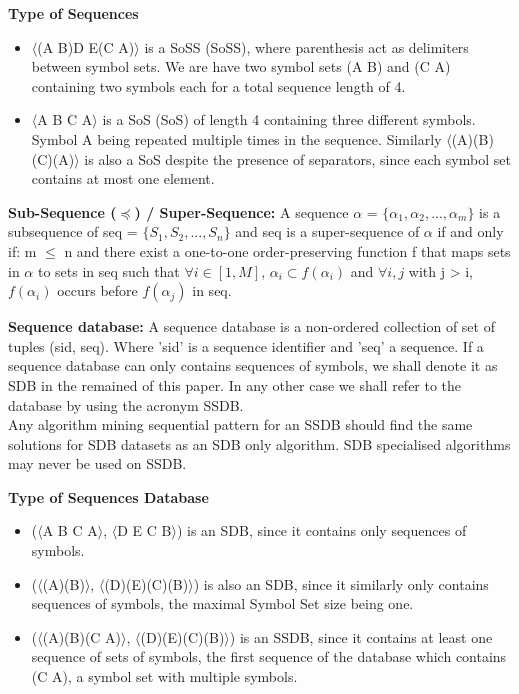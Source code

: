 \documentclass{eplmastersthesis}
\begin{document}
\begin{example}{\bfseries Type of Sequences}
\begin{itemize}
\item $\langle$(A B)D E(C A)$\rangle$ is a \acrlong{SoSS} (\acrshort{SoSS}), where parenthesis act as delimiters between symbol sets. We are have two symbol sets (A B) and (C A) containing two symbols each for a total sequence length of 4.
\item $\langle$A B C A$\rangle$ is a \acrlong{SoS} (\acrshort{SoS}) of length 4 containing three different symbols. Symbol A being repeated multiple times in the sequence. Similarly $\langle$(A)(B)(C)(A)$\rangle$ is also a \acrshort{SoS} despite the presence of separators, since each symbol set contains at most one element.
\end{itemize}
\end{example}

\begin{definition}{\bfseries Sub-Sequence ($\preceq$) / Super-Sequence:}
A sequence $\alpha$ = $\{\alpha_1, \alpha_2, ..., \alpha_m\}$ is a subsequence of seq = $\{S_1, S_2, ..., S_n\}$ and seq is a super-sequence of $\alpha$ if and only if: m $\leq$ n and there exist a one-to-one order-preserving function f that maps sets in $\alpha$ to sets in seq such that $\forall i \in [1, M]$, $\alpha_i \subset f(\alpha_i)$ and $\forall i,j$ with j > i, $f(\alpha_i)$ occurs before $f(\alpha_j)$ in seq.
\end{definition}

\begin{definition}{\bfseries Sequence database:}
A sequence database is a non-ordered collection of set of tuples (sid, seq). Where 'sid' is a sequence identifier and 'seq' a sequence. If a sequence database can only contains sequences of symbols, we shall denote it as SDB in the remained of this paper. In any other case we shall refer to the database by using the acronym SSDB. \\
Any algorithm mining sequential pattern for an SSDB should find the same solutions for SDB datasets as an SDB only algorithm. SDB specialised algorithms may never be used on SSDB.
\end{definition}

\begin{example}{\bfseries Type of Sequences Database}
\begin{itemize}
\item ($\langle$A B C A$\rangle$, $\langle$D E C B$\rangle$) is an SDB, since it contains only sequences of symbols.
\item ($\langle$(A)(B)$\rangle$, $\langle$(D)(E)(C)(B)$\rangle$) is also an SDB, since it similarly only contains sequences of symbols, the maximal Symbol Set size being one. 
\item ($\langle$(A)(B)(C A)$\rangle$, $\langle$(D)(E)(C)(B)$\rangle$) is an SSDB, since it contains at least one sequence of sets of symbols, the first sequence of the database which contains (C A), a symbol set with multiple symbols.
\end{itemize}
\end{example}
\end{document}

